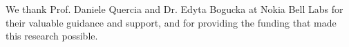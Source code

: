 \documentclass[sigconf, authorversion, nonacm, screen]{acmart}
\begin{document}

\begin{acks}
We thank Prof. Daniele Quercia and Dr. Edyta Bogucka at Nokia Bell Labs for their valuable guidance and support, and for providing the funding that made this research possible.
\end{acks}




\appendix










\end{document}
